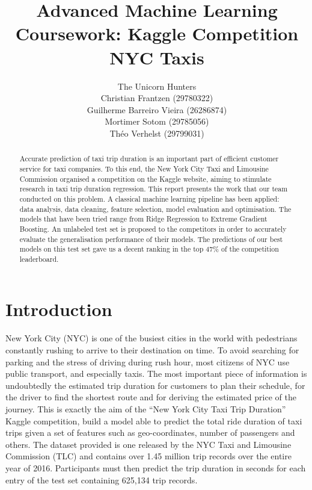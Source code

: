\documentclass[a4paper]{article}
\author{The Unicorn Hunters\\
Christian Frantzen (29780322)\\
Guilherme Barreiro Vieira (26286874)\\
Mortimer Sotom (29785056)\\
Théo Verhelst (29799031)}
\title{Advanced Machine Learning Coursework: Kaggle Competition NYC Taxis}
\begin{document}
\maketitle


\begin{abstract}
Accurate prediction of taxi trip duration is an important part of efficient
customer service for taxi companies. To this end, the New York City Taxi
and Limousine Commission organised a competition on the Kaggle website, aiming
to stimulate research in taxi trip duration regression. This report presents the
work that our team conducted on this problem. A classical machine learning
pipeline has been applied: data analysis, data cleaning, feature selection,
model evaluation and optimisation. The models that have been tried range from
Ridge Regression to Extreme Gradient Boosting. An unlabeled test set is proposed
to the competitors in order to accurately evaluate the generalisation
performance of their models. The predictions of our best models on this test set
gave us a decent ranking in the top 47\% of the competition leaderboard.
\end{abstract}

\section{Introduction}
New York City (NYC) is one of the busiest cities in the world with pedestrians
constantly rushing to arrive to their destination on time. To avoid searching
for parking and the stress of driving during rush hour, most citizens of NYC use
public transport, and especially taxis. The most important piece of information
is undoubtedly the estimated trip duration for customers to plan their schedule,
for the driver to find the shortest route and for deriving the estimated price
of the journey. This is exactly the aim of the ``New York City Taxi Trip
Duration'' Kaggle competition, build a model able to predict the total ride
duration of taxi trips given a set of features such as geo-coordinates, number
of passengers and others. The dataset provided is one released by the NYC Taxi
and Limousine Commission (TLC) and contains over 1.45 million trip records over
the entire year of 2016. Participants must then predict the trip duration in
seconds for each entry of the test set containing 625,134 trip records.
\end{document}
